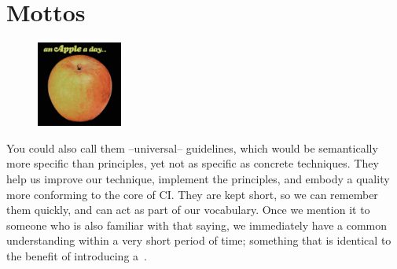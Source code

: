 \chapter{Mottos}\label{ch:mottos}

\begin{figure}
    \centering
    \includegraphics[width=0.25\textwidth]{images/mottos}
\end{figure}

You could also call them --universal-- guidelines, which would be semantically more specific than principles, yet not as specific as concrete techniques.
They help us improve our technique, implement the principles, and embody a quality more conforming to the core of CI\@.
They are kept short, so we can remember them quickly, and can act as part of our vocabulary.
Once we mention it to someone who is also familiar with that saying, we immediately have a common understanding within a very short period of time; something that is identical to the benefit of introducing a~.

